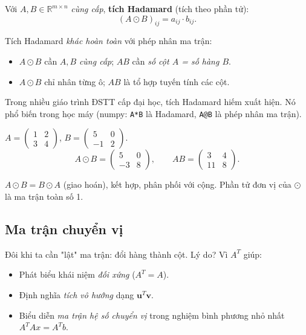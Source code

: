 \documentclass[12pt,a4paper]{article}
\begin{document}
\begin{dinhnghia}
  Với $A, B \in \mathbb{R}^{m \times n}$ \emph{cùng cấp}, \textbf{tích Hadamard} (tích theo phần tử):
  \[
    (A \odot B)_{ij} = a_{ij} \cdot b_{ij}.
  \]
\end{dinhnghia}

\begin{luuy}
Tích Hadamard \emph{khác hoàn toàn} với phép nhân ma trận:
\begin{itemize}
  \item $A\odot B$ cần $A, B$ \emph{cùng cấp}; $AB$ cần \emph{số cột $A$ = số hàng $B$}.
  \item $A\odot B$ chỉ nhân từng ô; $AB$ là tổ hợp tuyến tính các cột.
\end{itemize}
Trong nhiều giáo trình ĐSTT cấp đại học, tích Hadamard hiếm xuất hiện. Nó phổ biến trong học máy (numpy: \verb|A*B| là Hadamard, \verb|A@B| là phép nhân ma trận).
\end{luuy}

\begin{vidu}
$A = \begin{pmatrix}1&2\\3&4\end{pmatrix}$, $B = \begin{pmatrix}5&0\\-1&2\end{pmatrix}$.
\[
  A\odot B = \begin{pmatrix}5 & 0\\-3 & 8\end{pmatrix},\qquad AB = \begin{pmatrix}3 & 4\\11 & 8\end{pmatrix}.
\]
\end{vidu}

\begin{tinhchat}
$A \odot B = B \odot A$ (giao hoán), kết hợp, phân phối với cộng. Phần tử đơn vị của $\odot$ là ma trận toàn số 1.
\end{tinhchat}

\subsection{Ma trận chuyển vị}

\begin{dongco}
Đôi khi ta cần "lật" ma trận: đổi hàng thành cột. Lý do? Vì $A^T$ giúp:
\begin{itemize}
  \item Phát biểu khái niệm \emph{đối xứng} ($A^T = A$).
  \item Định nghĩa \emph{tích vô hướng} dạng $\mathbf{u}^T \mathbf{v}$.
  \item Biểu diễn \emph{ma trận hệ số chuyển vị} trong nghiệm bình phương nhỏ nhất $A^T A x = A^T b$.
\end{itemize}
\end{dongco}
\end{document}

